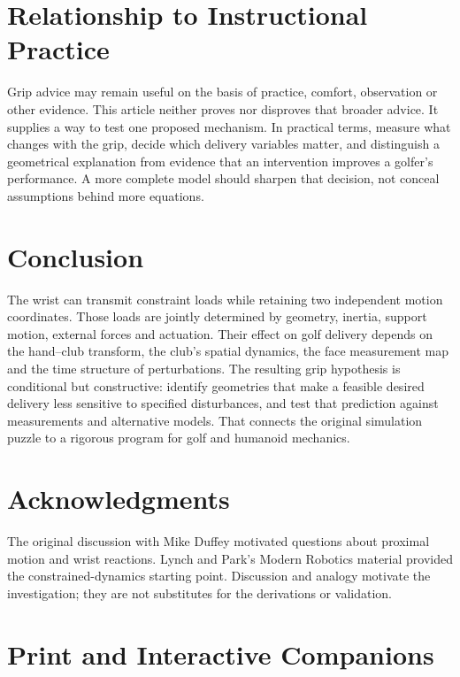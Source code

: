 \documentclass[
  11pt,
]{article}
\begin{document}
\section{Relationship to Instructional
Practice}\label{relationship-to-instructional-practice}

Grip advice may remain useful on the basis of practice, comfort,
observation or other evidence. This article neither proves nor disproves
that broader advice. It supplies a way to test one proposed mechanism.
In practical terms, measure what changes with the grip, decide which
delivery variables matter, and distinguish a geometrical explanation
from evidence that an intervention improves a golfer's performance. A
more complete model should sharpen that decision, not conceal
assumptions behind more equations.

\section{Conclusion}\label{conclusion}

The wrist can transmit constraint loads while retaining two independent
motion coordinates. Those loads are jointly determined by geometry,
inertia, support motion, external forces and actuation. Their effect on
golf delivery depends on the hand--club transform, the club's spatial
dynamics, the face measurement map and the time structure of
perturbations. The resulting grip hypothesis is conditional but
constructive: identify geometries that make a feasible desired delivery
less sensitive to specified disturbances, and test that prediction
against measurements and alternative models. That connects the original
simulation puzzle to a rigorous program for golf and humanoid mechanics.

\section*{Acknowledgments}\label{acknowledgments}

The original discussion with Mike Duffey motivated questions about
proximal motion and wrist reactions. Lynch and Park's Modern Robotics
material provided the constrained-dynamics starting point. Discussion
and analogy motivate the investigation; they are not substitutes for the
derivations or validation.

\section{Print and Interactive
Companions}\label{print-and-interactive-companions}
\end{document}
